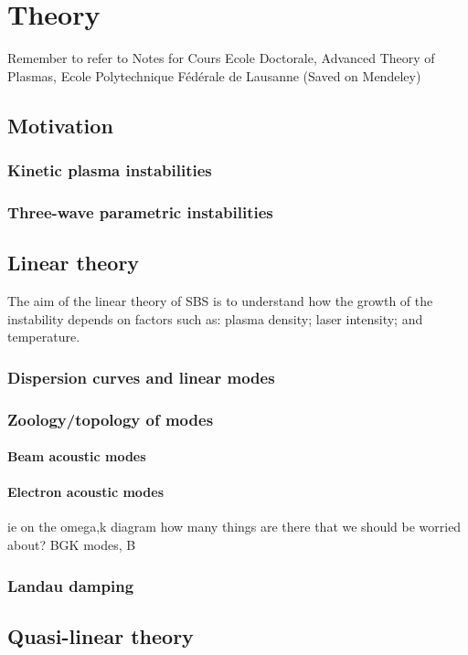 \chapter{Theory}
\label{chp:theory}

Remember to refer to Notes for Cours Ecole Doctorale, Advanced Theory of Plasmas, Ecole Polytechnique Fédérale de Lausanne (Saved on Mendeley)

\section{Motivation}
\subsection{Kinetic plasma instabilities}
\subsection{Three-wave parametric instabilities}

\section{Linear theory}
The aim of the linear theory of \acrshort{SBS} is to understand how the growth
 of the instability depends on factors such as: plasma density; laser intensity; and temperature.
\subsection{Dispersion curves and linear modes}
\subsection{Zoology/topology of modes}
\subsubsection{Beam acoustic modes}
\subsubsection{Electron acoustic modes}
ie on the omega,k diagram how many things are there that we should be worried
about? BGK modes, B\cite{Kruer96}
\subsection{Landau damping}

\section{Quasi-linear theory}

